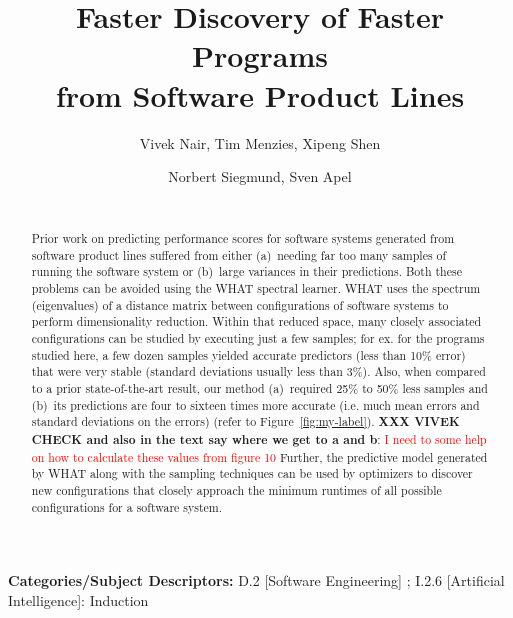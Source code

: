 \documentclass{sig-alternative}
\newcommand{\fig}[1]{Figure~\ref{fig:#1}}
\begin{document}
\title{Faster Discovery  of Faster Programs \\from Software Product Lines} 
\author{
        \alignauthor Vivek Nair, Tim Menzies, Xipeng Shen 
    \and  
        \alignauthor Norbert Siegmund, Sven Apel \\
        \\
       }

\maketitle 
\thispagestyle{plain}
\pagestyle{plain}
\begin{abstract}
Prior work on predicting performance scores for software systems generated from
software product lines suffered from either (a)~needing far too many samples
of running the software system or (b)~large variances in their predictions.
Both these problems can be avoided using the WHAT
spectral learner. 
WHAT  uses the spectrum (eigenvalues) of a distance matrix
between configurations of software systems to perform dimensionality reduction. Within that
reduced space, many closely associated configurations can be studied
by executing just a few samples; for ex. for the programs studied
here, a few dozen samples yielded accurate predictors (less than 10\% error)
that were very stable (standard deviations usually less than 3\%).  
Also, when compared to a prior state-of-the-art result, our method (a)~required  
25\% to 50\% less samples 
and (b)~its predictions are   four to sixteen times more accurate (i.e. much mean errors
and 
standard deviations on the errors) (refer to \fig{my-label}). 
{\bf XXX VIVEK CHECK and also in  the text say where we get to a and b}: \textcolor{red}{I need to some help on how to calculate these values from figure 10}  
Further, the predictive model generated by
WHAT along with the sampling techniques can be used by optimizers to discover new configurations that closely
approach the minimum runtimes of all possible configurations for a software system.
\end{abstract}

\vspace{1mm}
\noindent
{\bf Categories/Subject Descriptors:} 
D.2 [Software Engineering] ;
I.2.6 [Artificial Intelligence]: Induction
\end{document}
